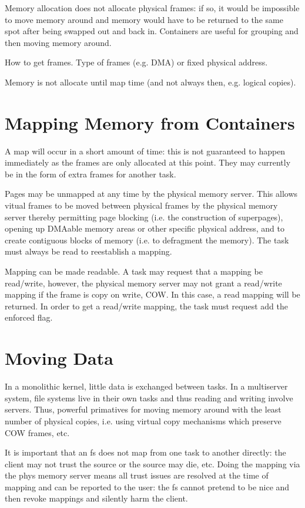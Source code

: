 Memory allocation does not allocate physical frames: if so, it would
be impossible to move memory around and memory would have to be
returned to the same spot after being swapped out and back in.
Containers are useful for grouping and then moving memory around.

How to get frames.  Type of frames (e.g. DMA) or fixed physical address.

Memory is not allocate until map time (and not always then,
e.g. logical copies).

\section{Mapping Memory from Containers}

A map will occur in a short amount of time: this is not guaranteed to
happen immediately as the frames are only allocated at this point.
They may currently be in the form of extra frames for another task.

Pages may be unmapped at any time by the physical memory server.  This
allows vitual frames to be moved between physical frames by the
physical memory server thereby permitting page blocking (i.e. the
construction of superpages), opening up DMAable memory areas or other
specific physical address, and to create contiguous blocks of memory
(i.e. to defragment the memory).  The task must always be read to
reestablish a mapping.

Mapping can be made readable.  A task may request that a mapping be
read/write, however, the physical memory server may not grant a
read/write mapping if the frame is copy on write, COW.  In this case, a
read mapping will be returned.  In order to get a read/write mapping,
the task must request add the enforced flag.

\section{Moving Data}

In a monolithic kernel, little data is exchanged between tasks.  In a
multiserver system, file systems live in their own tasks and thus
reading and writing involve servers.  Thus, powerful primatives for
moving memory around with the least number of physical copies,
i.e. using virtual copy mechanisms which preserve COW frames, etc.

It is important that an fs does not map from one task to another
directly: the client may not trust the source or the source may die,
etc.  Doing the mapping via the phys memory server means all trust
issues are resolved at the time of mapping and can be reported to the
user: the fs cannot pretend to be nice and then revoke mappings and
silently harm the client.

